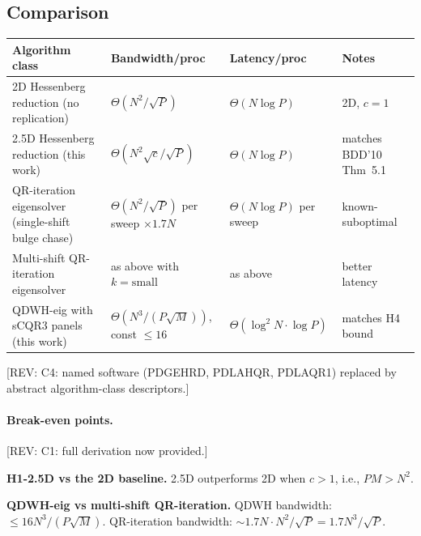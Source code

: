 \documentclass[11pt]{article}
\newcommand{\REV}[1]{\textcolor{blue!60!black}{\small\textsf{[REV: #1]}}}
\begin{document}
\subsection{Comparison}
\label{sec:B3g}

\begin{center}\scriptsize
\setlength{\tabcolsep}{4pt}
\begin{tabular}{@{}llll@{}}
\toprule
Algorithm class & Bandwidth/proc & Latency/proc & Notes \\
\midrule
2D Hessenberg reduction (no replication)              & $\Theta(N^2/\sqrt{P})$                            & $\Theta(N \log P)$              & 2D, $c{=}1$ \\
2.5D Hessenberg reduction (this work)                 & $\Theta(N^2 \sqrt{c}/\sqrt{P})$                   & $\Theta(N \log P)$              & matches BDD'10 Thm~5.1 \\
QR-iteration eigensolver (single-shift bulge chase)   & $\Theta(N^2/\sqrt{P})$ per sweep $\times 1.7N$    & $\Theta(N \log P)$ per sweep    & known-suboptimal \\
Multi-shift QR-iteration eigensolver                  & as above with $k = \mathrm{small}$                & as above                        & better latency \\
QDWH-eig with sCQR3 panels (this work)                & $\Theta(N^3/(P\sqrt{M}))$, const $\le 16$         & $\Theta(\log^2 N \cdot \log P)$ & matches H4 bound \\
\bottomrule
\end{tabular}
\end{center}
\REV{C4: named software (PDGEHRD, PDLAHQR, PDLAQR1) replaced by
abstract algorithm-class descriptors.}

\paragraph{Break-even points.}
\REV{C1: full derivation now provided.}

\textbf{H1-2.5D vs the 2D baseline.} 2.5D outperforms 2D when
$c > 1$, i.e., $PM > N^2$.

\textbf{QDWH-eig vs multi-shift QR-iteration.}
QDWH bandwidth: $\le 16 N^3/(P\sqrt{M})$.
QR-iteration bandwidth: $\sim 1.7N \cdot N^2/\sqrt{P} = 1.7 N^3/\sqrt{P}$.
\end{document}
